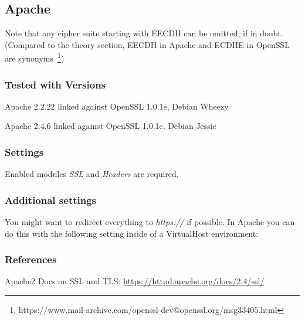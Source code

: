 \subsection{Apache}

Note that any cipher suite starting with EECDH can be omitted, if in doubt.
(Compared to the theory section, EECDH in Apache and ECDHE in OpenSSL are
synonyms~\footnote{https://www.mail-archive.com/openssl-dev@openssl.org/msg33405.html})

\subsubsection{Tested with Versions}
\begin{itemize*}
  \item Apache 2.2.22 linked against OpenSSL 1.0.1e, Debian Wheezy
  \item Apache 2.4.6 linked against OpenSSL 1.0.1e, Debian Jessie
\end{itemize*}

\subsubsection{Settings}
Enabled modules \emph{SSL} and \emph{Headers} are required.


\subsubsection{Additional settings}
You might want to redirect everything to \emph{https://} if possible. In Apache
you can do this with the following setting inside of a VirtualHost environment:



\subsubsection{References}
\begin{itemize*}
  \item Apache2 Docs on SSL and TLS: \url{https://httpd.apache.org/docs/2.4/ssl/}
\end{itemize*}


